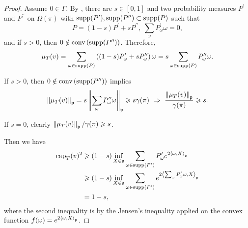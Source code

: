 \documentclass[suri,pdfbookmark]{engsuribt} %
\begin{document}
\begin{proof}
    Assume $0 \in \Gamma$. By \cite[Lemma 3.22]{key8}, there are $s \in [0,1]$ and two probability measures $P^{\prime}$ and $P^{\prime\prime}$ on $\Omega(\pi)$ with $\operatorname{supp}(P^{\prime}),\operatorname{supp}(P^{\prime\prime}) \subset \operatorname{supp} (P)$ such that
    \begin{equation*}
      P = (1-s) P^{\prime} + sP^{\prime\prime},~\sum_{\omega}P_{\omega}^{\prime}\omega = 0,
    \end{equation*}
    and if $s > 0$, then $0 \notin \operatorname{conv}\left(\operatorname{supp} (P^{\prime\prime})\right)$. Therefore,
    \begin{equation*}
      \mu_T(v) = \sum_{\omega\in \operatorname{supp}(P)} \left((1-s) P_{\omega}^{\prime} + sP_{\omega}^{\prime\prime}\right) \omega = s\sum_{\omega\in \operatorname{supp}(P)}P_{\omega}^{\prime\prime} \omega.
    \end{equation*}

    If $s > 0$, then $0 \notin \operatorname{conv}\left(\operatorname{supp} (P^{\prime\prime})\right)$ implies 
    \begin{equation*}
      \left\lVert\mu_T(v)\right\lVert_{\mathfrak{p}} = s \left\lVert\sum_{\omega}P_{\omega}^{\prime\prime} \omega\right\lVert_{\mathfrak{p}} \geqslant s \gamma(\pi) ~\Rightarrow~ \frac{\left\lVert\mu_T(v)\right\lVert_{\mathfrak{p}}}{\gamma(\pi)} \geqslant s.
    \end{equation*}

    If $s = 0$, clearly $\left\lVert\mu_T(v)\right\lVert_{\mathfrak{p}} / \gamma(\pi) \geqslant s$.

    Then we have
    \begin{equation*}
      \begin{split}
        \operatorname{cap}_T(v)^2 &\geqslant (1-s)\inf_{X \in \mathfrak{a}} \sum_{\omega \in \operatorname{supp} (P^{\prime})} P^{\prime}_{\omega}e^{2\left\langle \omega,X \right\rangle_{\mathfrak{p}}} \\
        &\geqslant (1-s)\inf_{X \in \mathfrak{a}} \sum_{\omega \in \operatorname{supp} (P^{\prime})} e^{2\left\langle \sum_{\omega}P_{\omega}^{\prime}\omega,X \right\rangle_{\mathfrak{p}}} \\ 
        &= 1-s,
      \end{split}
    \end{equation*}
    where the second inequality is by the Jensen’s inequality applied on the convex function $f(\omega) = e^{2\left\langle \omega,X \right\rangle_{\mathfrak{p}}}$.
  \end{proof}
\end{document}
